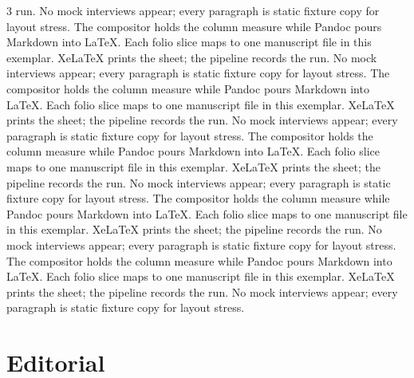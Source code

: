 \documentclass[
]{article}
\begin{document}
\begin{multicols}{3}
run. No mock interviews appear; every paragraph is static fixture copy
for layout stress. The compositor holds the column measure while Pandoc
pours Markdown into LaTeX. Each folio slice maps to one manuscript file
in this exemplar. XeLaTeX prints the sheet; the pipeline records the
run. No mock interviews appear; every paragraph is static fixture copy
for layout stress. The compositor holds the column measure while Pandoc
pours Markdown into LaTeX. Each folio slice maps to one manuscript file
in this exemplar. XeLaTeX prints the sheet; the pipeline records the
run. No mock interviews appear; every paragraph is static fixture copy
for layout stress. The compositor holds the column measure while Pandoc
pours Markdown into LaTeX. Each folio slice maps to one manuscript file
in this exemplar. XeLaTeX prints the sheet; the pipeline records the
run. No mock interviews appear; every paragraph is static fixture copy
for layout stress. The compositor holds the column measure while Pandoc
pours Markdown into LaTeX. Each folio slice maps to one manuscript file
in this exemplar. XeLaTeX prints the sheet; the pipeline records the
run. No mock interviews appear; every paragraph is static fixture copy
for layout stress. The compositor holds the column measure while Pandoc
pours Markdown into LaTeX. Each folio slice maps to one manuscript file
in this exemplar. XeLaTeX prints the sheet; the pipeline records the
run. No mock interviews appear; every paragraph is static fixture copy
for layout stress.

\end{multicols}

\newpage

\section{Editorial}\label{editorial}
\end{document}
